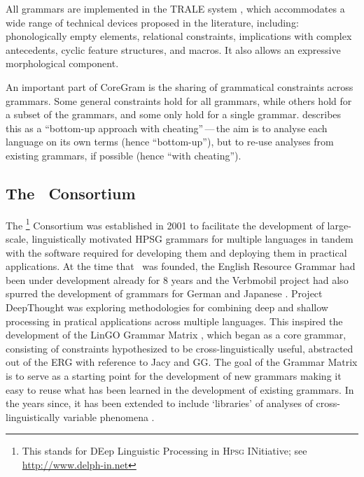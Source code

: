 \documentclass[output=paper,nonflat]{langsci/langscibook}
\begin{document}
All grammars are implemented
in the TRALE system \citep{MPR2002a-u,Penn2004a-u},
which accommodates a wide range of technical devices proposed in the literature, including:
phonologically empty elements,
relational constraints,
implications with complex antecedents,
cyclic feature structures,
and macros.
It also allows an expressive morphological component.

An important part of CoreGram is the sharing of grammatical constraints across grammars.
Some general constraints hold for all grammars,
while others hold for a subset of the grammars,
and some only hold for a single grammar.
\citet{MuellerCoreGram} describes this as a ``bottom-up approach with cheating''\,---\,the aim is to analyse each language on its own terms (hence ``bottom-up''),
but to re-use analyses from existing grammars, if possible (hence ``with cheating'').



\subsection{The \delphin\ Consortium}
\label{cl:delphin}

The \delphin\footnote{This stands for DEep Linguistic
  Processing in \textsc{Hpsg} INitiative; see \url{http://www.delph-in.net}} Consortium
was established in 2001 to facilitate the development of large-scale,
linguistically motivated HPSG grammars for multiple languages in tandem
with the software required for developing them and deploying them in
practical applications. At the time that \delphin\ was founded, the
English Resource Grammar
\citep[ERG;][]{Flickinger2000a,Flickinger2011a-u} had been under
development already for 8 years and the Verbmobil project
\citep{Wahlster:00} had also spurred the development of grammars for
German \citep[GG;][]{Mue:Kap:00,Crysmann2003b} and Japanese
\citep[Jacy;][]{SBB2016a}. Project DeepThought
\citep{Callmeier-etal:2004} was exploring methodologies for combining
deep and shallow processing in pratical applications across multiple
languages. This inspired the development of the LinGO Grammar Matrix
\citep{BFO2002a-u}, which began as a core grammar, consisting of
constraints hypothesized to be cross-linguistically useful, abstracted
out of the ERG with reference to Jacy and GG. The goal of the Grammar
Matrix is to serve as a starting point for the development of new
grammars making it easy to reuse what has been learned in the
development of existing grammars. In the years since, it has been
extended to include `libraries' of analyses of cross-linguistically
variable phenomena
\citep[\eg][]{Drellishak2009a-u,BDFPS2010a-u}.
\end{document}
